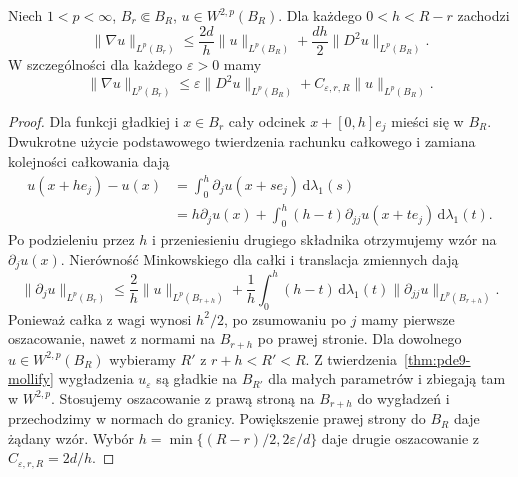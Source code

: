 \begin{lemat}
\label{lem:pde16-gradinterp}
Niech $1<p<\infty$, $B_r\Subset B_R$, $u\in W^{2,p}(B_R)$.
Dla każdego $0<h<R-r$ zachodzi
\[
 \|\nabla u\|_{L^p(B_r)}
 \le \frac{2d}{h}\|u\|_{L^p(B_R)}
 +\frac{dh}{2}\|D^2u\|_{L^p(B_R)}.
\]
W szczególności dla każdego $\varepsilon>0$ mamy
\[
 \|\nabla u\|_{L^p(B_r)}\le
 \varepsilon\|D^2u\|_{L^p(B_R)}
 +C_{\varepsilon,r,R}\|u\|_{L^p(B_R)}.
\]
\end{lemat}
\begin{proof}
Dla funkcji gładkiej i $x\in B_r$ cały odcinek
$x+[0,h]e_j$ mieści się w $B_R$.
Dwukrotne użycie podstawowego twierdzenia rachunku
całkowego i zamiana kolejności całkowania dają
\[
 \begin{aligned}
 u(x+he_j)-u(x)
 &=\int_0^h\partial_ju(x+se_j)\,\mathrm d\lambda_1(s)\\
 &=h\partial_ju(x)+\int_0^h(h-t)
       \partial_{jj}u(x+te_j)\,\mathrm d\lambda_1(t).
 \end{aligned}
\]
Po podzieleniu przez $h$ i przeniesieniu drugiego
składnika otrzymujemy wzór na $\partial_ju(x)$.
Nierówność Minkowskiego dla całki i translacja zmiennych
dają
\[
 \|\partial_ju\|_{L^p(B_r)}
 \le \frac2h\|u\|_{L^p(B_{r+h})}
 +\frac1h\int_0^h(h-t)\,\mathrm d\lambda_1(t)
       \|\partial_{jj}u\|_{L^p(B_{r+h})}.
\]
Ponieważ całka z wagi wynosi $h^2/2$, po zsumowaniu
po $j$ mamy pierwsze oszacowanie, nawet z normami
na $B_{r+h}$ po prawej stronie. Dla dowolnego
$u\in W^{2,p}(B_R)$ wybieramy $R'$ z $r+h<R'<R$.
Z twierdzenia~\ref{thm:pde9-mollify} wygładzenia
$u_\varepsilon$ są gładkie na $B_{R'}$ dla małych
parametrów i zbiegają tam w $W^{2,p}$.
Stosujemy oszacowanie z prawą stroną na $B_{r+h}$
do wygładzeń i przechodzimy w normach do granicy.
Powiększenie prawej strony do $B_R$ daje żądany wzór.
Wybór $h=\min\{(R-r)/2,2\varepsilon/d\}$
daje drugie oszacowanie z $C_{\varepsilon,r,R}=2d/h$.
\end{proof}

